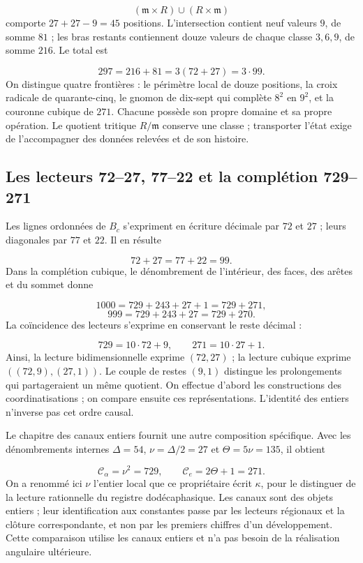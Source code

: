 \[
(\mathfrak m\times R)\cup(R\times\mathfrak m)
\]
comporte \(27+27-9=45\) positions. L'intersection contient neuf valeurs \(9\), de somme \(81\) ; les bras restants contiennent douze valeurs de chaque classe \(3,6,9\), de somme \(216\). Le total est

\[
297=216+81=3(72+27)=3\cdot99.
\]
On distingue quatre frontières : le périmètre local de douze positions, la croix radicale de quarante-cinq, le gnomon de dix-sept qui complète \(8^2\) en \(9^2\), et la couronne cubique de \(271\). Chacune possède son propre domaine et sa propre opération. Le quotient tritique \(R/\mathfrak m\) conserve une classe ; transporter l'état exige de l'accompagner des données relevées et de son histoire.

\subsection{Les lecteurs 72–27, 77–22 et la complétion 729–271}
Les lignes ordonnées de \(B_c\) s'expriment en écriture décimale par \(72\) et \(27\) ; leurs diagonales par \(77\) et \(22\). Il en résulte

\[
72+27=77+22=99.
\]
Dans la complétion cubique, le dénombrement de l'intérieur, des faces, des arêtes et du sommet donne

\[
1000=729+243+27+1=729+271,
\]
\[
999=729+243+27=729+270.
\]
La coïncidence des lecteurs s'exprime en conservant le reste décimal :

\[
729=10\cdot72+9,\qquad271=10\cdot27+1.
\]
Ainsi, la lecture bidimensionnelle exprime \((72,27)\) ; la lecture cubique exprime \(((72,9),(27,1))\). Le couple de restes \((9,1)\) distingue les prolongements qui partageraient un même quotient. On effectue d'abord les constructions des coordinatisations ; on compare ensuite ces représentations. L'identité des entiers n'inverse pas cet ordre causal.

Le chapitre des canaux entiers fournit une autre composition spécifique. Avec les dénombrements internes \(\Delta=54\), \(\nu=\Delta/2=27\) et \(\Theta=5\nu=135\), il obtient

\[
\mathcal C_\alpha=\nu^2=729,
\qquad \mathcal C_e=2\Theta+1=271.
\]
On a renommé ici \(\nu\) l'entier local que ce propriétaire écrit \(\kappa\), pour le distinguer de la lecture rationnelle du registre dodécaphasique. Les canaux sont des objets entiers ; leur identification aux constantes passe par les lecteurs régionaux et la clôture correspondante, et non par les premiers chiffres d'un développement. Cette comparaison utilise les canaux entiers et n'a pas besoin de la réalisation angulaire ultérieure.

